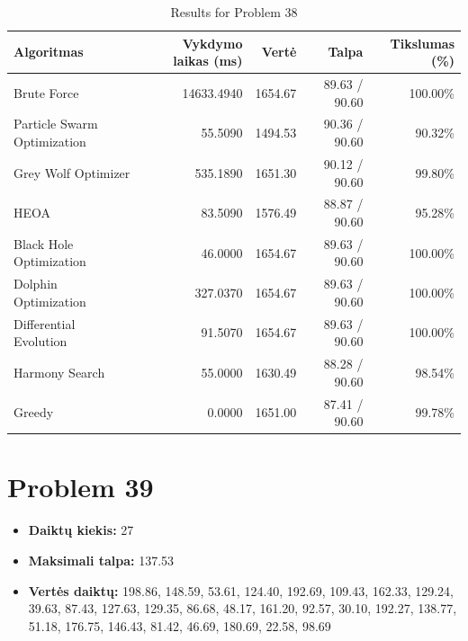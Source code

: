 \documentclass[a4paper,11pt]{article}
\begin{document}
\begin{table}[h!]
\centering
\begin{tabular}{lrrrr}
\toprule
\textbf{Algoritmas} & \textbf{Vykdymo laikas (ms)} & \textbf{Vertė} & \textbf{Talpa} & \textbf{Tikslumas (\%)} \\
\midrule
Brute Force & 14633.4940 & 1654.67 & 89.63 / 90.60 & 100.00\% \\
Particle Swarm Optimization & 55.5090 & 1494.53 & 90.36 / 90.60 & 90.32\% \\
Grey Wolf Optimizer & 535.1890 & 1651.30 & 90.12 / 90.60 & 99.80\% \\
HEOA & 83.5090 & 1576.49 & 88.87 / 90.60 & 95.28\% \\
Black Hole Optimization & 46.0000 & 1654.67 & 89.63 / 90.60 & 100.00\% \\
Dolphin Optimization & 327.0370 & 1654.67 & 89.63 / 90.60 & 100.00\% \\
Differential Evolution & 91.5070 & 1654.67 & 89.63 / 90.60 & 100.00\% \\
Harmony Search & 55.0000 & 1630.49 & 88.28 / 90.60 & 98.54\% \\
Greedy & 0.0000 & 1651.00 & 87.41 / 90.60 & 99.78\% \\
\bottomrule
\end{tabular}
\caption{Results for Problem 38}
\end{table}
\clearpage

\section*{Problem 39}
\begin{itemize}
    \item \textbf{Daiktų kiekis:} 27
    \item \textbf{Maksimali talpa:} 137.53
    \item \textbf{Vertės daiktų:} 198.86, 148.59, 53.61, 124.40, 192.69, 109.43, 162.33, 129.24, 39.63, 87.43, 127.63, 129.35, 86.68, 48.17, 161.20, 92.57, 30.10, 192.27, 138.77, 51.18, 176.75, 146.43, 81.42, 46.69, 180.69, 22.58, 98.69
\end{itemize}
\end{document}
